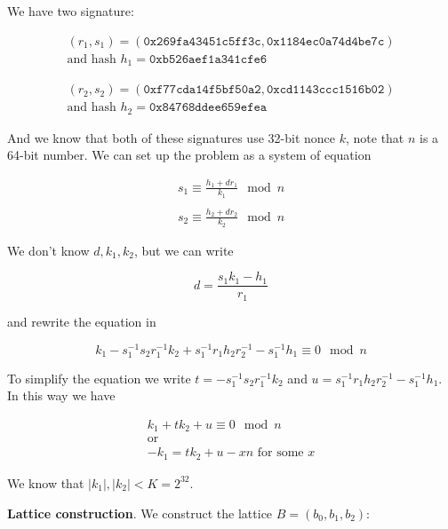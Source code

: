 \documentclass[a4paper,12pt]{report}
\begin{document}
\vspace*{10px}

We have two signature:

\[
    \begin{array}{c}
        (r_1, s_1) = (\texttt{0x269fa43451c5ff3c}, \texttt{0x1184ec0a74d4be7c}) \\
        \text{and hash } h_1 = \texttt{0xb526aef1a341cfe6}
    \end{array}
\]

\[
    \begin{array}{c}
        (r_2, s_2) = (\texttt{0xf77cda14f5bf50a2}, \texttt{0xcd1143ccc1516b02}) \\ 
        \text{and hash } h_2 = \texttt{0x84768ddee659efea}
    \end{array}
\]

And we know that both of these signatures use 32-bit nonce $k$, note that $n$ is a 64-bit number. We can set up the problem as a system of equation

\[
    \begin{array}{c}
        s_1 \equiv \displaystyle\frac{h_1 + dr_1}{k_1} \mod n \\ \\ 
        s_2 \equiv \displaystyle\frac{h_2 + dr_2}{k_2} \mod n
    \end{array}
\]

We don't know $d, k_1, k_2$, but we can write 

\[
    d = \displaystyle\frac{s_1k_1 - h_1}{r_1}
\]

and rewrite the equation in

\[
    k_1 - s_1^{-1}s_2r_1^{-1}k_2 + s_1^{-1}r_1h_2r_2^{-1} - s_1^{-1}h_1 \equiv 0 \mod n
\]

To simplify the equation we write $t = - s_1^{-1}s_2r_1^{-1}k_2$ and $u = s_1^{-1}r_1h_2r_2^{-1} - s_1^{-1}h_1$. In this way we have

\[
    \begin{array}{c}
        k_1 + tk_2 + u \equiv 0 \mod n \\
        \text{or} \\
        -k_1 = tk_2 + u - xn \text{   for some $x$}
    \end{array}
\]

We know that $|k_1|, |k_2| < K = 2^{32}$.

\vspace*{10px}

\textbf{Lattice construction}. We construct the lattice $B = (b_0, b_1, b_2)$:
\end{document}
